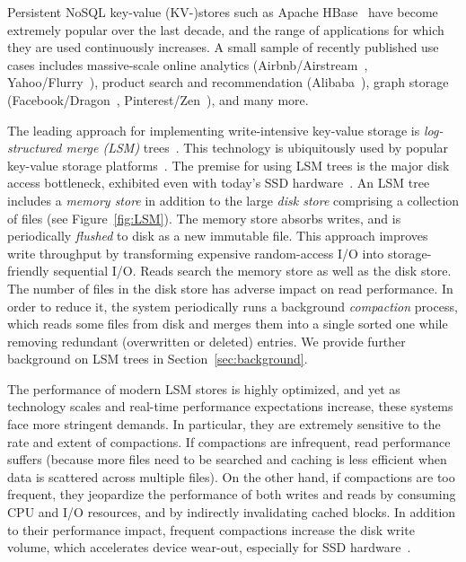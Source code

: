 
Persistent NoSQL key-value (KV-)stores such as Apache HBase~\cite{hbase} have become extremely popular over the last decade, 
and the range of applications for which they are used continuously increases. A small sample of  recently 
published use cases includes massive-scale online analytics (Airbnb/Airstream~\cite{airbnb}, 
Yahoo/Flurry~\cite{flurry}), product search 
and recommendation (Alibaba~\cite{alibabahbase}), 
graph storage (Facebook/Dragon~\cite{dragon}, 
Pinterest/Zen~\cite{zen}), and many more. 

The leading approach for implementing write-intensive key-value storage is \emph{log-structured merge (LSM)} trees~\cite{O'Neil:1996}.
This technology is ubiquitously used by popular key-value storage platforms~\cite{leveldb, rocksdb, scylladb, Chang2008, cassandra, HBase, mongodb, mysql}. 
The premise for using LSM trees is the major disk access bottleneck, exhibited even with today's SSD hardware~\cite{rocksdb,Tanenbaum:2014:MOS:2655363,Wu:2012:AWB:2093139.2093140}. 
An LSM tree includes a \emph{memory store} in addition to the large \emph{disk store} comprising a collection of files
(see Figure~\ref{fig:LSM}). 
The memory store absorbs writes, and is periodically \emph{flushed} to disk as a new immutable file. 
This approach improves write throughput by transforming expensive random-access I/O into storage-friendly sequential I/O. 
Reads search the memory store as well as the disk store. The number of files in the disk store has adverse impact on read performance. 
In order to reduce it, the system periodically runs a background \emph{compaction} process, which reads some files from 
disk and merges them into a single sorted one while removing redundant (overwritten or deleted) entries.
We provide further background on LSM trees in Section~\ref{sec:background}.

The performance of modern LSM stores is highly optimized, and yet as technology scales and real-time 
performance expectations increase, these systems face more stringent  demands. In particular, 
they are extremely sensitive to the rate and extent of compactions. If compactions are infrequent, read performance
suffers (because more files need to be searched and caching is less efficient when  data is scattered across multiple files). On the other hand, if 
compactions are too frequent, they jeopardize the performance of both writes and reads by consuming CPU and I/O resources, and by indirectly invalidating cached blocks. 
In addition to their performance impact, frequent compactions increase the disk write volume, which  
accelerates device wear-out, especially for SSD hardware~\cite{Hu:2009}. 

